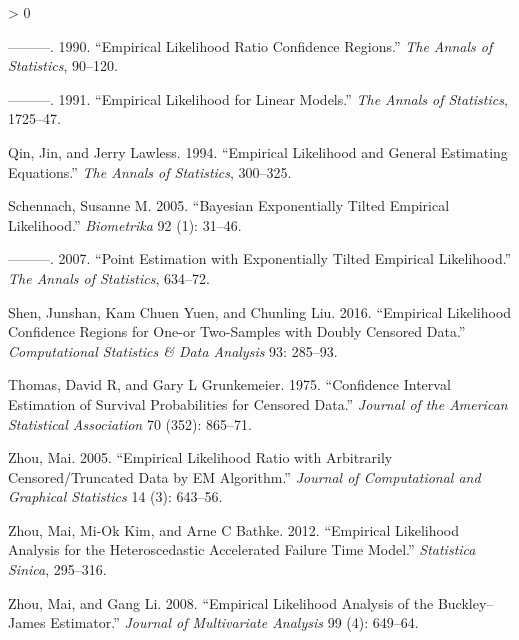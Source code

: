 \documentclass[article]{jss}
\newlength{\cslhangindent}
\newenvironment{CSLReferences}[2] %
 {%
  \setlength{\parindent}{0pt}
  \ifodd #1 \everypar{\setlength{\hangindent}{\cslhangindent}}\ignorespaces\fi
  \ifnum #2 > 0
  \setlength{\parskip}{#2\baselineskip}
  \fi
 }%
 {}
\renewcommand{\|}{\,|\,}
\begin{document}
\begin{CSLReferences}{1}{0}
\leavevmode\hypertarget{ref-owen1990}{}%
---------. 1990. {``Empirical Likelihood Ratio Confidence Regions.''} \emph{The Annals of Statistics}, 90--120.

\leavevmode\hypertarget{ref-owen1991}{}%
---------. 1991. {``Empirical Likelihood for Linear Models.''} \emph{The Annals of Statistics}, 1725--47.

\leavevmode\hypertarget{ref-qin-lawless1994}{}%
Qin, Jin, and Jerry Lawless. 1994. {``Empirical Likelihood and General Estimating Equations.''} \emph{The Annals of Statistics}, 300--325.

\leavevmode\hypertarget{ref-schennach2005}{}%
Schennach, Susanne M. 2005. {``Bayesian Exponentially Tilted Empirical Likelihood.''} \emph{Biometrika} 92 (1): 31--46.

\leavevmode\hypertarget{ref-schennach2007}{}%
---------. 2007. {``Point Estimation with Exponentially Tilted Empirical Likelihood.''} \emph{The Annals of Statistics}, 634--72.

\leavevmode\hypertarget{ref-shen-et-al2016}{}%
Shen, Junshan, Kam Chuen Yuen, and Chunling Liu. 2016. {``Empirical Likelihood Confidence Regions for One-or Two-Samples with Doubly Censored Data.''} \emph{Computational Statistics \& Data Analysis} 93: 285--93.

\leavevmode\hypertarget{ref-thomas-grunkemeier1975}{}%
Thomas, David R, and Gary L Grunkemeier. 1975. {``Confidence Interval Estimation of Survival Probabilities for Censored Data.''} \emph{Journal of the American Statistical Association} 70 (352): 865--71.

\leavevmode\hypertarget{ref-zhou2005}{}%
Zhou, Mai. 2005. {``Empirical Likelihood Ratio with Arbitrarily Censored/Truncated Data by EM Algorithm.''} \emph{Journal of Computational and Graphical Statistics} 14 (3): 643--56.

\leavevmode\hypertarget{ref-zhou-et-al2012}{}%
Zhou, Mai, Mi-Ok Kim, and Arne C Bathke. 2012. {``Empirical Likelihood Analysis for the Heteroscedastic Accelerated Failure Time Model.''} \emph{Statistica Sinica}, 295--316.

\leavevmode\hypertarget{ref-zhou-li2008}{}%
Zhou, Mai, and Gang Li. 2008. {``Empirical Likelihood Analysis of the Buckley--James Estimator.''} \emph{Journal of Multivariate Analysis} 99 (4): 649--64.

\end{CSLReferences}
\end{document}
